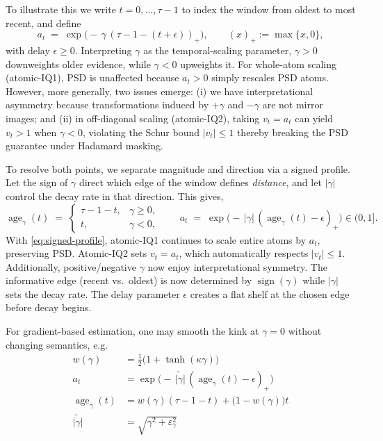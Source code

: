 \documentclass[12pt,letterpaper]{article}
\begin{document}
To illustrate this we write $t=0,\dots,\tau\!-\!1$ to index the window from oldest to most recent, and define
\begin{equation}
a_t \;=\; \exp\!\Big(-\,\gamma\,(\tau-1-(t+\epsilon))_+\Big),
\qquad
(x)_+ := \max\{x,0\},
\label{eq:temporal-exponential}
\end{equation}
with delay $\epsilon\ge 0$. Interpreting $\gamma$ as the temporal-scaling parameter, $\gamma>0$ downweights older evidence, while $\gamma<0$ upweights it. For whole-atom scaling (atomic-IQ1), PSD is unaffected because $a_t>0$ simply rescales PSD atoms. However, more generally, two issues emerge: (i) we have interpretational asymmetry because transformations induced by $+\gamma$ and $-\gamma$ are not mirror images; and (ii) in off-diagonal scaling (atomic-IQ2), taking $v_t=a_t$ can yield $v_t>1$ when $\gamma<0$, violating the Schur bound $|v_t|\le 1$ thereby breaking the PSD guarantee under Hadamard masking.

To resolve both points, we separate magnitude and direction via a signed profile. Let the sign of $\gamma$ direct which edge of the window defines \emph{distance}, and let $|\gamma|$ control the decay rate in that direction. This gives,
\begin{equation}
\operatorname{age}_\gamma(t)
\;=\;
\begin{cases}
\tau-1-t, & \gamma \ge 0,\\[3pt]
t, & \gamma < 0,
\end{cases}
\qquad
a_t \;=\; \exp\!\Big(-\,|\gamma|\,(\operatorname{age}_\gamma(t)-\epsilon)_+\Big)\in(0,1].
\label{eq:signed-profile}
\end{equation}
With \eqref{eq:signed-profile}, atomic-IQ1 continues to scale entire atoms by $a_t$, preserving PSD. Atomic-IQ2 sets $v_t=a_t$, which automatically respects $|v_t|\le 1$. Additionally, positive/negative $\gamma$ now enjoy interpretational symmetry. The informative edge (recent vs.\ oldest) is now determined by $\operatorname{sign}(\gamma)$ while $|\gamma|$ sets the decay rate. The delay parameter $\epsilon$ creates a flat shelf at the chosen edge before decay begins.

For gradient-based estimation, one may smooth the kink at $\gamma=0$ without changing semantics, e.g.
\begin{equation}
\begin{aligned}
w(\gamma) &= \tfrac{1}{2}\bigl(1+\tanh(\kappa\gamma)\bigr) \\[6pt]
a_t &= \exp\!\Big(-\,\widetilde{|\gamma|}\,(\operatorname{age}_\gamma(t)-\epsilon)_+\Big) \\[6pt]
\operatorname{age}_\gamma(t) &= w(\gamma)(\tau-1-t) + \bigl(1-w(\gamma)\bigr)t \\[6pt]
\widetilde{|\gamma|} &= \sqrt{\gamma^2+\varepsilon_\gamma^2}
\end{aligned}
\label{eq:signed-smooth}
\end{equation}
\end{document}
